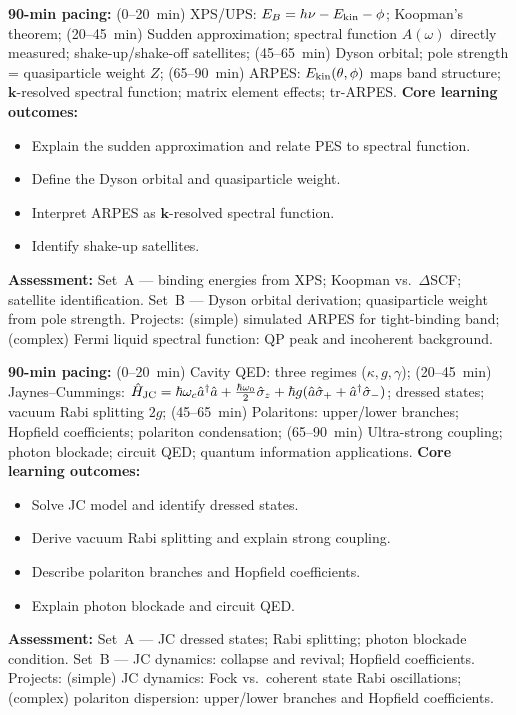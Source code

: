 \documentclass[11pt,a4paper]{article}
\begin{document}
\medskip

\begin{tcolorbox}[modulebox, title={Module~II.6 --- Lecture L11: Photoelectron Spectroscopy}]
\textbf{90-min pacing:} (0--20~min) XPS/UPS: $E_B=h\nu-E_{\rm kin}-\phi$; Koopman's theorem; (20--45~min) Sudden approximation; spectral function $A(\omega)$ directly measured; shake-up/shake-off satellites; (45--65~min) Dyson orbital; pole strength = quasiparticle weight $Z$; (65--90~min) ARPES: $E_{\rm kin}(\theta,\phi)$ maps band structure; $\mathbf{k}$-resolved spectral function; matrix element effects; tr-ARPES.
\medskip\textbf{Core learning outcomes:}
\begin{itemize}[leftmargin=1.4em,topsep=2pt,itemsep=1pt]
  \item Explain the sudden approximation and relate PES to spectral function.
  \item Define the Dyson orbital and quasiparticle weight.
  \item Interpret ARPES as $\mathbf{k}$-resolved spectral function.
  \item Identify shake-up satellites.
\end{itemize}
\medskip\textbf{Assessment:}
Set~A --- binding energies from XPS; Koopman vs.\ $\Delta$SCF; satellite identification.
Set~B --- Dyson orbital derivation; quasiparticle weight from pole strength.
Projects: (simple) simulated ARPES for tight-binding band; (complex) Fermi liquid spectral function: QP peak and incoherent background.
\end{tcolorbox}

\medskip

\begin{tcolorbox}[modulebox, title={Module~II.6 --- Lecture L12: Cavity QED and Strong Light--Matter Coupling}]
\textbf{90-min pacing:} (0--20~min) Cavity QED: three regimes ($\kappa,g,\gamma$); (20--45~min) Jaynes--Cummings: $\hat{H}_{\rm JC}=\hbar\omega_c\hat{a}^\dagger\hat{a}+\tfrac{\hbar\omega_0}{2}\hat\sigma_z+\hbar g(\hat{a}\hat\sigma_++\hat{a}^\dagger\hat\sigma_-)$; dressed states; vacuum Rabi splitting $2g$; (45--65~min) Polaritons: upper/lower branches; Hopfield coefficients; polariton condensation; (65--90~min) Ultra-strong coupling; photon blockade; circuit QED; quantum information applications.
\medskip\textbf{Core learning outcomes:}
\begin{itemize}[leftmargin=1.4em,topsep=2pt,itemsep=1pt]
  \item Solve JC model and identify dressed states.
  \item Derive vacuum Rabi splitting and explain strong coupling.
  \item Describe polariton branches and Hopfield coefficients.
  \item Explain photon blockade and circuit QED.
\end{itemize}
\medskip\textbf{Assessment:}
Set~A --- JC dressed states; Rabi splitting; photon blockade condition.
Set~B --- JC dynamics: collapse and revival; Hopfield coefficients.
Projects: (simple) JC dynamics: Fock vs.\ coherent state Rabi oscillations; (complex) polariton dispersion: upper/lower branches and Hopfield coefficients.
\end{tcolorbox}
\end{document}
